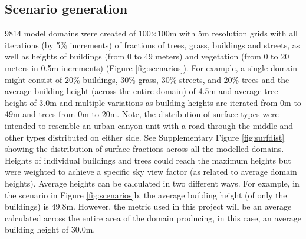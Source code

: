 \documentclass[final,3p,times,authoryear]{elsarticle}
\begin{document}
\subsection{Scenario generation}\label{sec:methodsgen}
9814 model domains were created of 100$\times$100m with 5m resolution grids with all iterations (by 5\% increments) of fractions of trees, grass, buildings and streets, as well as heights of buildings (from 0 to 49 meters) and vegetation (from 0 to 20 meters in 0.5m increments) (Figure \ref{fig:scenarios}). For example, a single domain might consist of 20\% buildings, 30\% grass, 30\% streets, and 20\% trees and the average building height (across the entire domain) of 4.5m and average tree height of 3.0m and multiple variations as building heights are iterated from 0m to 49m and trees from 0m to 20m. Note, the distribution of surface types were intended to resemble an urban canyon unit with a road through the middle and other types distributed on either side. See Supplementary Figure \ref{fig:surfdist} showing the distribution of surface fractions across all the modelled domains. Heights of individual buildings and trees could reach the maximum heights but were weighted to achieve a specific sky view factor (as related to average domain heights). Average heights can be calculated in two different ways. For example, in the scenario in Figure \ref{fig:scenarios}b, the average building height (of only the buildings) is 49.8m. However, the metric used in this project will be an average calculated across the entire area of the domain producing, in this case, an average building height of 30.0m.




\end{document}
